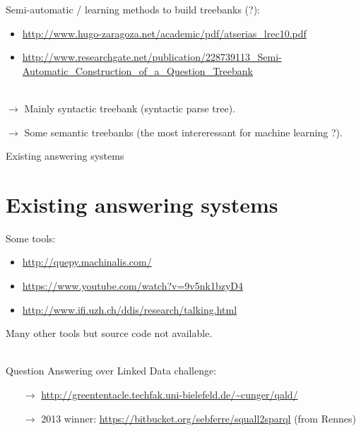 \documentclass[10pt]{beamer}
\begin{document}

\begin{frame}

Semi-automatic / learning methods to build treebanks (?): 
	\begin{itemize}
		\item \url{http://www.hugo-zaragoza.net/academic/pdf/atserias_lrec10.pdf}
		\item \url{http://www.researchgate.net/publication/228739113_Semi-Automatic_Construction_of_a_Question_Treebank}
	\end{itemize}
	
~\\

$\rightarrow$	Mainly syntactic treebank (syntactic parse tree).

$\rightarrow$	Some semantic treebanks (the most intereressant for machine learning ?).
	
\end{frame}


\begin{frame}{Existing answering systems}

\section{Existing answering systems}

Some tools:
\begin{itemize}
	\item \url{http://quepy.machinalis.com/}
	\item \url{https://www.youtube.com/watch?v=9v5nk1bzyD4}
	\item \url{http://www.ifi.uzh.ch/ddis/research/talking.html}
\end{itemize}

Many other tools but source code not available.

~\\

Question Answering over Linked Data challenge: 
\begin{itemize}
	\item[$\rightarrow$] \url{http://greententacle.techfak.uni-bielefeld.de/~cunger/qald/}
	\item[$\rightarrow$] 2013 winner: \url{https://bitbucket.org/sebferre/squall2sparql} (from Rennes)
\end{itemize}
		
\end{frame}
\end{document}
